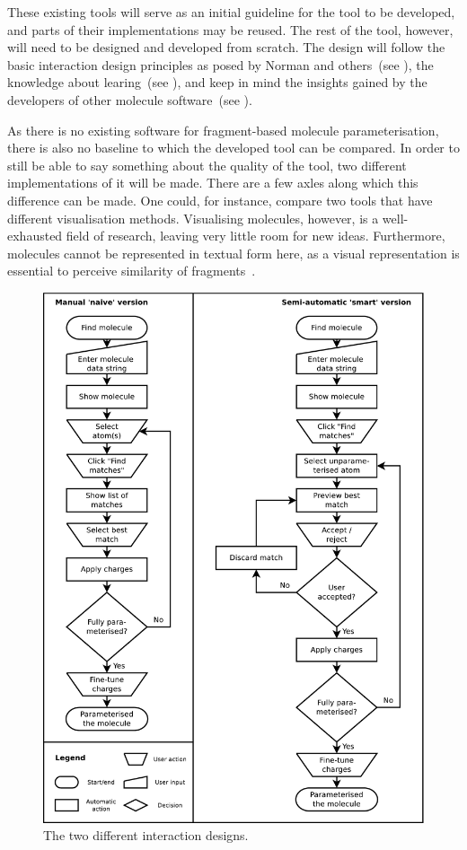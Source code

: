 These existing tools will serve as an initial guideline for the tool to be developed, and parts of their implementations may be reused. The rest of the tool, however, will need to be designed and developed from scratch. The design will follow the basic interaction design principles as posed by Norman and others~(see ), the knowledge about learing~(see ), and keep in mind the insights gained by the developers of other molecule software~(see ).

As there is no existing software for fragment-based molecule parameterisation, there is also no baseline to which the developed tool can be compared. In order to still be able to say something about the quality of the tool, two different implementations of it will be made. There are a few axles along which this difference can be made. One could, for instance, compare two tools that have different visualisation methods. Visualising molecules, however, is a well-exhausted field of research, leaving very little room for new ideas. Furthermore, molecules cannot be represented in textual form here, as a visual representation is essential to perceive similarity of fragments~\cite{gallopoulos1994computer}.

\vspace{-.2cm}
\begin{figure}[h!]
\begin{center}
\includegraphics[width=.9\textwidth]{img/complete_id.pdf}
\caption{The two different interaction designs.}
\end{center}
\end{figure}

